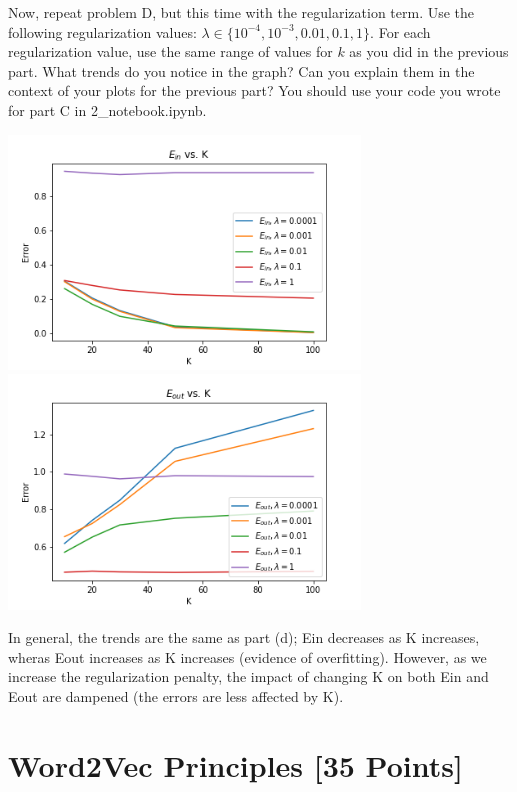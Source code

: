 \problem[5]
Now, repeat problem D, but this time with the regularization term. Use the following regularization values: $\lambda \in \{10^{-4}, 10^{-3}, 0.01, 0.1, 1\}$. For each regularization value, use the same range of values for $k$ as you did in the previous part. What trends do you notice in the graph? Can you explain them in the context of your plots for the previous part? You should use your code you wrote for part C in 2_notebook.ipynb.

\begin{solution}
	\begin{center}
		\includegraphics[width=0.7\textwidth]{2e_ein.png}
		\includegraphics[width=0.7\textwidth]{2e_eout.png}
	\end{center}
	In general, the trends are the same as part (d); Ein decreases as K increases, wheras Eout increases as K increases (evidence of overfitting). However, as we increase the regularization penalty, the impact of changing K on both Ein and Eout are dampened (the errors are less affected by K).
\end{solution}






\newpage
\section{Word2Vec Principles [35 Points]}

